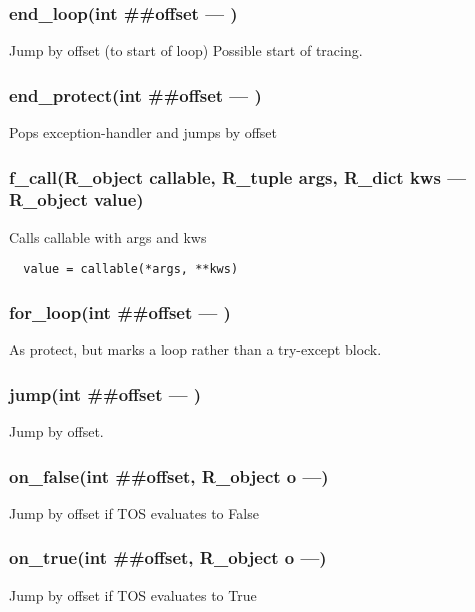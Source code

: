\subsubsection{end\_loop(int \#\#offset --- )}
\vspace{-1em}Jump by offset (to start of loop) Possible start of tracing. \vspace{-1em}
\subsubsection{end\_protect(int \#\#offset --- )}
\vspace{-1em}Pops exception-handler and jumps by offset \vspace{-1em}
\subsubsection{f\_call(R\_object callable, R\_tuple args, R\_dict kws --- R\_object value)}
\vspace{-1em}Calls callable with args and kws \vspace{-1em}\begin{verbatim}
  value = callable(*args, **kws)
\end{verbatim}
\vspace{-1em}\vspace{-1em}
\subsubsection{for\_loop(int \#\#offset --- )}
\vspace{-1em}As protect, but marks a loop rather than a try-except block. \vspace{-1em}
\subsubsection{jump(int \#\#offset --- )}
\vspace{-1em}Jump by offset. \vspace{-1em}
\subsubsection{on\_false(int \#\#offset, R\_object o ---)}
\vspace{-1em}Jump by offset if TOS evaluates to False \vspace{-1em}
\subsubsection{on\_true(int \#\#offset, R\_object o ---)}
\vspace{-1em}Jump by offset if TOS evaluates to True \vspace{-1em}
